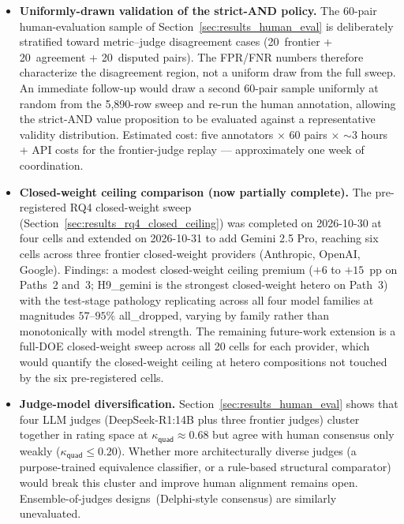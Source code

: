 \begin{itemize}
  \item \textbf{Uniformly-drawn validation of the strict-AND policy.} The 60-pair human-evaluation sample of Section~\ref{sec:results_human_eval} is deliberately stratified toward metric--judge disagreement cases (20~frontier + 20~agreement + 20~disputed pairs). The FPR/FNR numbers therefore characterize the disagreement region, not a uniform draw from the full sweep. An immediate follow-up would draw a second 60-pair sample uniformly at random from the 5{,}890-row sweep and re-run the human annotation, allowing the strict-AND value proposition to be evaluated against a representative validity distribution. Estimated cost: five annotators $\times$ 60 pairs $\times$ $\sim$3 hours + API costs for the frontier-judge replay --- approximately one week of coordination.

  \item \textbf{Closed-weight ceiling comparison (now partially complete).} The pre-registered RQ4 closed-weight sweep (Section~\ref{sec:results_rq4_closed_ceiling}) was completed on 2026-10-30 at four cells and extended on 2026-10-31 to add Gemini 2.5 Pro, reaching six cells across three frontier closed-weight providers (Anthropic, OpenAI, Google). Findings: a modest closed-weight ceiling premium ($+6$ to $+15$~pp on Paths~2 and~3; H9\_gemini is the strongest closed-weight hetero on Path~3) with the test-stage pathology replicating across all four model families at magnitudes $57$--$95\%$ \textsf{all\_dropped}, varying by family rather than monotonically with model strength. The remaining future-work extension is a full-DOE closed-weight sweep across all 20 cells for each provider, which would quantify the closed-weight ceiling at hetero compositions not touched by the six pre-registered cells.

  \item \textbf{Judge-model diversification.} Section~\ref{sec:results_human_eval} shows that four LLM judges (DeepSeek-R1:14B plus three frontier judges) cluster together in rating space at $\kappa_{\textsf{quad}} \approx 0.68$ but agree with human consensus only weakly ($\kappa_{\textsf{quad}} \leq 0.20$). Whether more architecturally diverse judges (a purpose-trained equivalence classifier, or a rule-based structural comparator) would break this cluster and improve human alignment remains open. Ensemble-of-judges designs~(Delphi-style consensus) are similarly unevaluated.


\end{itemize}
